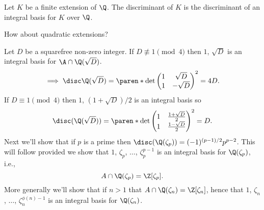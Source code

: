  Let $K$ be a finite extension of $\Q$.  The discriminant of $K$ is the discriminant of an integral basis for $K$ over $\Q$.

How about quadratic extensions?

Let $D$ be a squarefree non-zero integer.  If $D\nequiv1\pmod4$ then $1$, $\sqrt{D}$ is an integral basis for $\A\cap\Q(\sqrt{D})$.
\[ \implies \disc\Q(\sqrt{D}) = \paren*{\det\begin{pmatrix}
1 & \sqrt{D} \\
1 & -\sqrt{D}
\end{pmatrix}}^2 = 4D . \]
If $D\equiv1\pmod4$ then $1$, $(1+\sqrt{D})/2$ is an integral basis so
\[ \disc(\Q(\sqrt{D})) = \paren*{\det\begin{pmatrix}
1 & \frac{1+\sqrt{D}}{2} \\
1 & \frac{1-\sqrt{D}}{2}
\end{pmatrix}}^2 = D . \]
Next we'll show that if $p$ is a prime then $\disc(\Q(\zeta_p))=(-1)^{(p-1)/2}p^{p-2}$.  This will follow provided we show that $1$, $\zeta_p$, $\dotsc$, $\zeta_p^{p-1}$ is an integral basis for $\Q(\zeta_p)$, i.e.,
\[ A\cap\Q(\zeta_p)=\Z[\zeta_p] . \]
More generally we'll show that if $n>1$ that $A\cap\Q(\zeta_n)=\Z[\zeta_n]$, hence that $1$, $\zeta_n$, $\dotsc$, $\zeta_n^{\phi(n)-1}$ is an integral basis for $\Q(\zeta_n)$.

